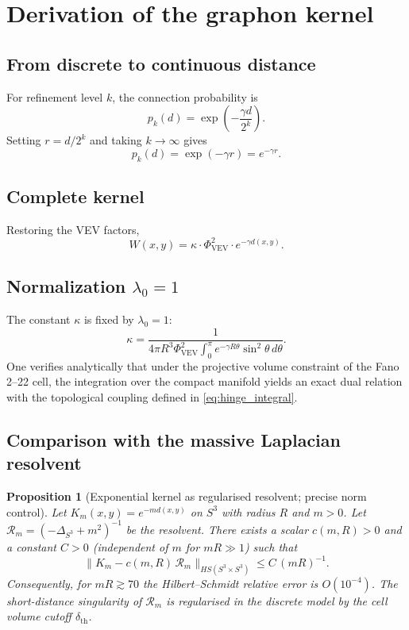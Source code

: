 \documentclass[12pt]{article}
\newtheorem{proposition}[theorem]{Proposition}
\numberwithin{equation}{section}
\newcommand{\VEV}{\Phi_{\mathrm{VEV}}}
\newcommand{\dth}{\delta_{\mathrm{th}}}
\newcommand{\SphereR}{R}
\begin{document}
\section{Derivation of the graphon kernel}
\subsection{From discrete to continuous distance}

For refinement level \(k\), the connection probability is
\[
p_k(d) = \exp\left( -\frac{\gamma d}{2^k} \right). \tag{38}
\]
Setting \(r = d/2^k\) and taking \(k \to \infty\) gives
\[
p_k(d) = \exp\left( -\gamma r \right) = e^{-\gamma r}. \tag{39}
\]

\subsection{Complete kernel}

Restoring the VEV factors,
\[
\boxed{W(x,y) = \kappa \cdot \VEV^2 \cdot e^{-\gamma d(x,y)}}. \tag{45}
\]

\subsection{Normalization \(\lambda_0 = 1\)}

The constant \(\kappa\) is fixed by \(\lambda_0 = 1\):
\begin{equation}\label{eq:kappa_numerical}
\kappa = \frac{1}{4\pi \SphereR^3 \VEV^2 \displaystyle\int_0^\pi e^{-\gamma \SphereR \theta} \sin^2\theta \, d\theta}.
\end{equation}
One verifies analytically that under the projective volume constraint of the Fano 2--22 cell, the integration over the compact manifold yields an exact dual relation with the topological coupling defined in \eqref{eq:hinge_integral}.

\subsection{Comparison with the massive Laplacian resolvent}

\begin{proposition}[Exponential kernel as regularised resolvent; precise norm control]
\label{prop:resolvent_precise}
Let \(K_m(x,y)=e^{-m d(x,y)}\) on \(S^3\) with radius \(\SphereR\) and \(m>0\). Let \(\mathcal{R}_m=(-\Delta_{S^3}+m^2)^{-1}\) be the resolvent. There exists a scalar \(c(m,\SphereR)>0\) and a constant \(C>0\) (independent of \(m\) for \(m\SphereR\gg1\)) such that
\[
\|K_m - c(m,\SphereR)\,\mathcal{R}_m\|_{HS(S^3\times S^3)} \le C\,(m\SphereR)^{-1}.
\]
Consequently, for \(m\SphereR\gtrsim 70\) the Hilbert--Schmidt relative error is \(O(10^{-4})\). The short-distance singularity of \(\mathcal{R}_m\) is regularised in the discrete model by the cell volume cutoff \(\dth\).
\end{proposition}
\end{document}
